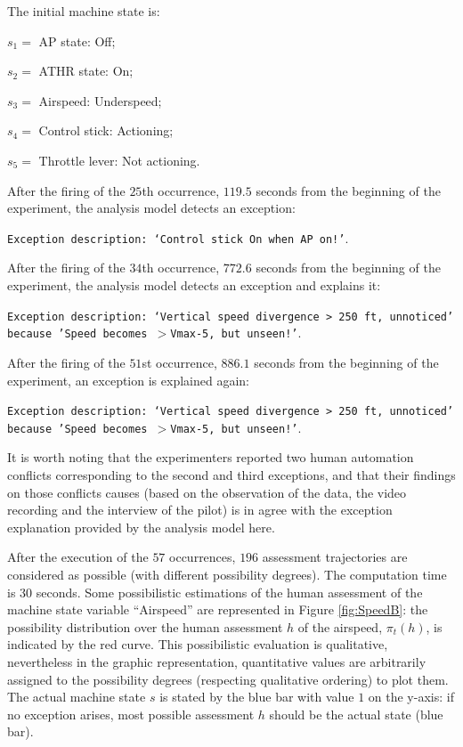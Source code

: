 The initial machine state is:
\begin{description}
\item $s_1=$ AP state: Off;
\item $s_2=$ ATHR state: On;
\item $s_3=$ Airspeed: Underspeed;
\item $s_4=$ Control stick: Actioning;
\item $s_5=$ Throttle lever:  Not actioning.
\end{description}
After the firing of the $25$th occurrence, 
$119.5$ seconds from the beginning of the experiment, 
the analysis model detects an exception:
\begin{description}
\item \texttt{Exception description: `Control stick On when AP on!'}.
\end{description}
After the firing of the $34$th occurrence, 
$772.6$ seconds from the beginning of the experiment, 
the analysis model detects an exception and explains it:
\begin{description}
\item \texttt{Exception description: `Vertical speed divergence $>$ 250 ft, unnoticed' because 'Speed becomes $>$Vmax-5, but unseen!'}.
\end{description}

After the firing of the $51$st occurrence, 
$886.1$ seconds from the beginning of the experiment, 
an exception is explained again:
\begin{description}
\item \texttt{Exception description: `Vertical speed divergence $>$ 250 ft, unnoticed' because 'Speed becomes $>$Vmax-5, but unseen!'}.
\end{description}
It is worth noting that the experimenters \cite{pizziol14} 
reported two human automation conflicts 
corresponding to the second and third exceptions, 
and that their findings on those conflicts causes 
(based on the observation of the data, 
the video recording and the interview of the pilot) 
is in agree with the exception explanation provided 
by the analysis model here.

After the execution of the $57$ occurrences, 
$196$ assessment trajectories are considered as possible 
(with different possibility degrees). 
The computation time is $30$ seconds. 
Some possibilistic estimations of the human assessment of the machine state 
variable ``Airspeed''
are represented in Figure \ref{fig:SpeedB}:
the possibility distribution over the human assessment $h$
of the airspeed, $\pi_t(h)$, is indicated by the red curve. 
This possibilistic evaluation is qualitative, 
nevertheless in the graphic representation, 
quantitative values are arbitrarily assigned 
to the possibility degrees 
(respecting qualitative ordering) to plot them. 
The actual machine state $s$ is stated 
by the blue bar with value $1$ on the y-axis:
if no exception arises, most possible assessment $h$ 
should be the actual state (blue bar). 

